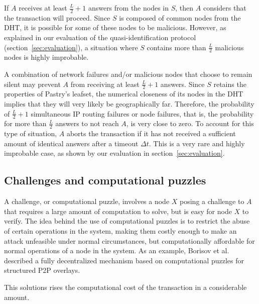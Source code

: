 If $A$ receives at least $\frac{L}{2} + 1$ answers from the nodes in $S$, then
$A$ considers that the transaction will proceed. Since $S$ is composed of
common nodes from the DHT, it is possible for some of these nodes to be
malicious. However, as explained in our evaluation of the quasi-identification
protocol (section~\ref{sec:evaluation}), a situation where $S$ contains more than
$\frac{L}{2}$ malicious nodes is highly improbable.

A combination of network failures and/or malicious nodes that choose to remain
silent may prevent $A$ from receiving at least $\frac{L}{2} + 1$ answers. Since
$S$ retains the properties of Pastry's leafset, the numerical closeness of its
nodes in the DHT implies that they will very likely be geographically far.
Therefore, the probability of $\frac{L}{2} + 1 $ simultaneous IP
routing failures or node failures, that is, the probability for more than
$\frac{L}{2}$ answers to not reach $A$, is very close to zero. To account for
this type of situation, $A$ aborts the transaction if it has not received a
sufficient amount of identical answers after a timeout $\Delta t$. This is a
very rare and highly improbable case, as shown by our evaluation
in section~\ref{sec:evaluation}.


\subsection{Challenges and computational puzzles}
\label{sec:challenges_puzzles}
A challenge, or computational puzzle, involves a node $X$ posing a challenge to
$A$ that requires a large amount of computation to solve, but is easy for node
$X$ to verify. The idea behind the use of
computational puzzles is to restrict the abuse of certain operations in the
system, making them costly enough to make an attack unfeasible under normal
circumstances, but computationally affordable for normal operations of a node
in the system. As an example, Borisov et al.~\cite{borisov2006computational} described a
fully decentralized mechanism based on computational puzzles for structured P2P
overlays.


This solutions rises the computational cost of the transaction in a
considerable amount.



